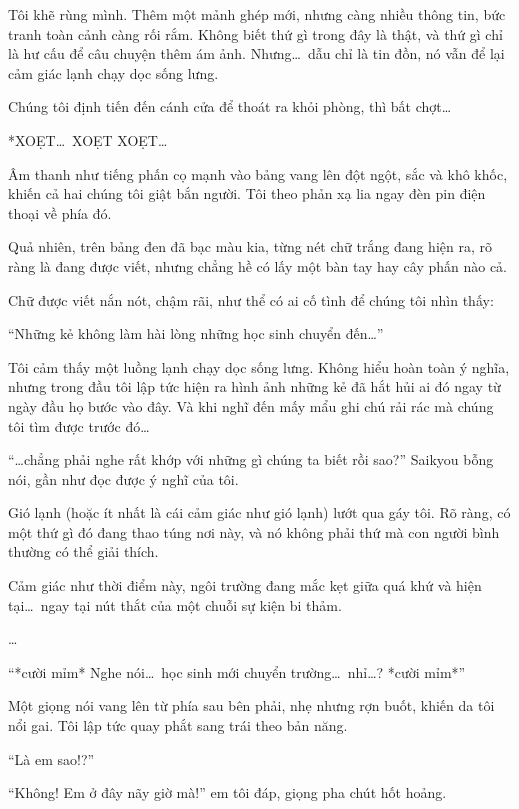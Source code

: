 \documentclass[../main.tex]{subfiles}
\begin{document}
Tôi khẽ rùng mình. Thêm một mảnh ghép mới, nhưng càng nhiều thông tin, bức tranh toàn cảnh càng rối rắm. Không biết thứ gì trong đây là thật, và thứ gì chỉ là hư cấu để câu chuyện thêm ám ảnh. Nhưng\dots\ dẫu chỉ là tin đồn, nó vẫn để lại cảm giác lạnh chạy dọc sống lưng.

Chúng tôi định tiến đến cánh cửa để thoát ra khỏi phòng, thì bất chợt\dots

*XOẸT\dots\ XOẸT XOẸT\dots*

Âm thanh như tiếng phấn cọ mạnh vào bảng vang lên đột ngột, sắc và khô khốc, khiến cả hai chúng tôi giật bắn người. Tôi theo phản xạ lia ngay đèn pin điện thoại về phía đó.

Quả nhiên, trên bảng đen đã bạc màu kia, từng nét chữ trắng đang hiện ra, rõ ràng là đang được viết, nhưng chẳng hề có lấy một bàn tay hay cây phấn nào cả.

Chữ được viết nắn nót, chậm rãi, như thể có ai cố tình để chúng tôi nhìn thấy:

\begin{center}
  ``Những kẻ không làm hài lòng những học sinh chuyển đến\dots''
\end{center}


Tôi cảm thấy một luồng lạnh chạy dọc sống lưng. Không hiểu hoàn toàn ý nghĩa, nhưng trong đầu tôi lập tức hiện ra hình ảnh những kẻ đã hắt hủi ai đó ngay từ ngày đầu họ bước vào đây. Và khi nghĩ đến mấy mẩu ghi chú rải rác mà chúng tôi tìm được trước đó\dots

``\dots chẳng phải nghe rất khớp với những gì chúng ta biết rồi sao?'' Saikyou bỗng nói, gần như đọc được ý nghĩ của tôi.

Gió lạnh (hoặc ít nhất là cái cảm giác như gió lạnh) lướt qua gáy tôi. Rõ ràng, có một thứ gì đó đang thao túng nơi này, và nó không phải thứ mà con người bình thường có thể giải thích.

Cảm giác như thời điểm này, ngôi trường đang mắc kẹt giữa quá khứ và hiện tại\dots\ ngay tại nút thắt của một chuỗi sự kiện bi thảm.

\dots

``*cười mỉm* Nghe nói\dots\ học sinh mới chuyển trường\dots\ nhỉ\dots? *cười mỉm*''

Một giọng nói vang lên từ phía sau bên phải, nhẹ nhưng rợn buốt, khiến da tôi nổi gai. Tôi lập tức quay phắt sang trái theo bản năng.

``Là em sao!?''

``Không! Em ở đây nãy giờ mà!'' em tôi đáp, giọng pha chút hốt hoảng.
\end{document}
